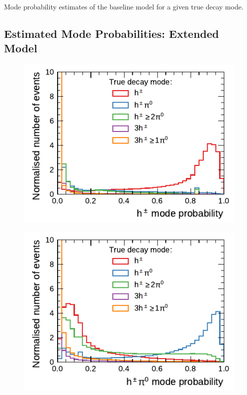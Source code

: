 \begin{minipage}{\textwidth}
\begin{subfigure}{0.48\textwidth}
  \end{subfigure}%

  \caption[Mode probability estimates of the RNN-based decay mode classification
  with the baseline model]{Mode probability estimates of the baseline model for
    a given true decay mode.}
  \label{fig:rnn_multiclass_proba_baseline}
\end{minipage}

\clearpage
\subsection{Estimated Mode Probabilities: Extended Model}
\label{app:combined_probabilities}

\noindent
\begin{minipage}{\textwidth}
  \captionsetup{type=figure}
  \begin{subfigure}{0.48\textwidth}
    \centering
    \includegraphics{./figures/decay_mode_classification/combined_proba/proba_1p0n.pdf}
  \end{subfigure}\hfill
  \begin{subfigure}{0.48\textwidth}
    \centering
    \includegraphics{./figures/decay_mode_classification/combined_proba/proba_1p1n.pdf}

\end{subfigure}
\end{minipage}
